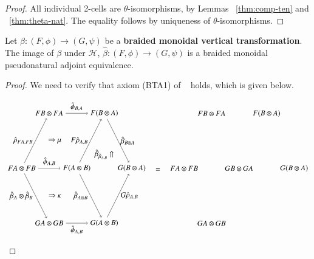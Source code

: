 \documentclass{amsart}
\begin{document}
\begin{proof}
All individual 2-cells are $\theta$-isomorphisms, by Lemmas ~\ref{thm:comp-ten} and ~\ref{thm:theta-nat}. The equality follows by uniqueness of $\theta$-isomorphisms.
\end{proof}

\begin{lem}\label{lem:brtran}
Let $\beta: (F, \phi) \rightarrow (G,\psi)$ be a {\bf braided monoidal vertical transformation}. The image of $\beta$ under $\mathcal{H}$, $\hat{\beta}: (F, \phi) \rightarrow (G,\psi)$ is a braided monoidal pseudonatural adjoint equivalence.
\end{lem}

\begin{proof}
We need to verify that axiom (BTA1) of ~\cite{mccrudden:bal-coalgb} holds, which is given below.

\begin{equation}
\begin{aligned}
\begin{tikzpicture}[scale=1.3]
\node (tl) at (1,4) {$FB \otimes FA$};
\node (tr) at (3,4) {$F(B \otimes A)$};
\node (ml) at (0,2) {$FA \otimes FB$};
\node (mm) at (2,2) {$F(A \otimes B)$};
\node (mr) at (4,2) {$G(B \otimes A)$};
\node (bl) at (1,0) {$GA \otimes GB$};
\node (br) at (3,0) {$G(A \otimes B)$};
\draw[->] (tl) to node [above] {$\hat{\phi}_{B,A}$} (tr);
\draw[->] (ml) to node [left] {$\hat{\rho}_{FA,FB}$} (tl);
\draw[->] (ml) to node [above] {$\hat{\phi}_{A,B}$} (mm);
\draw[->] (mm) to node [left] {$F\hat{\rho}_{A,B}$} (tr);
\draw[->] (tr) to node [right] {$\hat{\beta}_{B\otimes A}$} (mr);
\draw[->] (mm) to node [left] {$\hat{\beta}_{A\otimes B}$} (br);
\draw[->] (br) to node [right] {$G\hat{\rho}_{A,B}$} (mr);
\draw[->] (bl) to node [below] {$\hat{\phi}_{A,B}$} (br);
\draw[->] (ml) to node [left] {$\hat{\beta}_A \otimes \hat{\beta}_B$} (bl);
\node at (1.2,3) {$\Rightarrow \mu$};
\node at (1.2,1) {$\Rightarrow \kappa$};
\node at (3,2.5) {$\hat{\beta}_{\hat{\beta}_{A,B}}\Uparrow$};
\end{tikzpicture}
\end{aligned}
\hspace{0.25cm}
=
\hspace{0.25cm}
\begin{aligned}
\begin{tikzpicture}[scale=1.3]
\node (tl) at (1,4) {$FB \otimes FA$};
\node (tr) at (3,4) {$F(B \otimes A)$};
\node (ml) at (0,2) {$FA \otimes FB$};
\node (mm) at (2,2) {$GB \otimes GA$};
\node (mr) at (4,2) {$G(B \otimes A)$};
\node (bl) at (1,0) {$GA \otimes GB$};

\end{tikzpicture}
\end{aligned}
\end{equation}
\end{proof}
\end{document}
